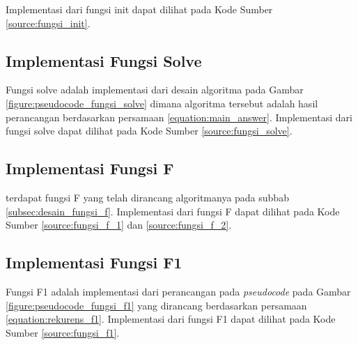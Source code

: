 Implementasi dari fungsi init dapat dilihat pada Kode Sumber \ref{source:fungsi_init}.



\subsection{Implementasi Fungsi Solve}

Fungsi solve adalah implementasi dari desain algoritma pada Gambar \ref{figure:pseudocode_fungsi_solve} dimana algoritma tersebut adalah hasil perancangan berdasarkan persamaan \ref{equation:main_answer}. Implementasi dari fungsi solve dapat dilihat pada Kode Sumber \ref{source:fungsi_solve}.
\\



\subsection{Implementasi Fungsi F}

terdapat fungsi F yang telah dirancang algoritmanya pada subbab \ref{subsec:desain_fungsi_f}. Implementasi dari fungsi F dapat dilihat pada Kode Sumber \ref{source:fungsi_f_1} dan \ref{source:fungsi_f_2}.

\begin{minipage}{\linewidth}

\end{minipage}

\begin{minipage}{\linewidth}
	
\end{minipage}

\subsection{Implementasi Fungsi F1}
Fungsi F1 adalah implementasi dari perancangan pada \textit{pseudocode} pada Gambar \ref{figure:pseudocode_fungsi_f1} yang dirancang berdasarkan persamaan \ref{equation:rekurens_f1}. Implementasi dari fungsi F1 dapat dilihat pada Kode Sumber \ref{source:fungsi_f1}.

